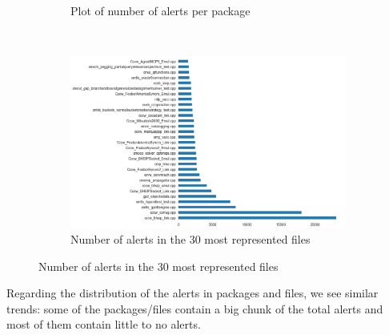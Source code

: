 \begin{figure}[H]
\begin{subfigure}{0.5\textwidth}
		\caption{Plot of number of alerts per package}\label{}
	\end{subfigure}\\
	\begin{subfigure}{\textwidth}
		\centering
		\includegraphics[scale=0.3]{./src/data_analysis/alerts_files_barh.jpg}
		\caption{Number of alerts in the 30 most represented files}\label{}
	\end{subfigure}%
\end{figure}

Regarding the distribution of the alerts in packages and files, we see similar trends: some of the packages/files contain a big chunk of the total alerts and most of them contain little to no alerts. 

